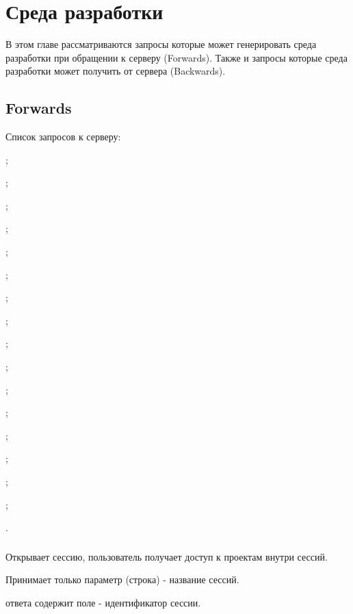 \section{Среда разработки}

В этом главе рассматриваются запросы которые может генерировать среда разработки при обращении к серверу (Forwards). Также и запросы которые среда разработки может получить от сервера (Backwards).

\subsection{Forwards}

Список запросов к серверу:
\begin{icItems}
	\item {};
	\item {};
	\item {};
	\item {};
	\item {};
	\item {};
	\item {};
	\item {};
	\item {};
	\item {};
	\item {};
	\item {};
	\item {};
	\item {};
	\item {};
	\item {};
	\item {}.
\end{icItems}

\subsubsection{}

Открывает сессию, пользователь получает доступ к проектам внутри сессий.

Принимает только параметр  (строка) - название сессий.

 ответа содержит поле  - идентификатор сессии.

